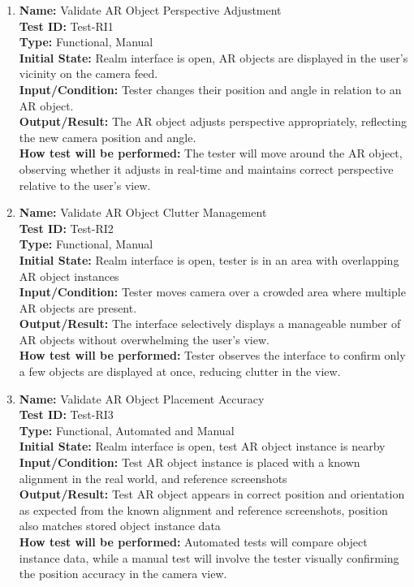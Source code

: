 \documentclass[12pt, titlepage]{article}
\begin{document}
\begin{enumerate}


  \item \textbf{Name:} Validate AR Object Perspective Adjustment \label{itm:Test-RI1} \\
        \textbf{Test ID:} Test-RI1 \\
        \textbf{Type:} Functional, Manual \\
        \textbf{Initial State:} Realm interface is open, AR objects are displayed in the user's vicinity on the camera feed. \\
        \textbf{Input/Condition:} Tester changes their position and angle in relation to an AR object. \\
        \textbf{Output/Result:} The AR object adjusts perspective appropriately, reflecting the new camera position and angle. \\ \textbf{How test will be performed:} The tester will move around the AR object, observing whether it adjusts in real-time and maintains correct perspective relative to the user's view.

  \item \textbf{Name:} Validate AR Object Clutter Management \label{itm:Test-RI2} \\
        \textbf{Test ID:} Test-RI2 \\
        \textbf{Type:} Functional, Manual \\
        \textbf{Initial State:} Realm interface is open, tester is in an area with overlapping AR object instances \\
        \textbf{Input/Condition:} Tester moves camera over a crowded area where multiple AR objects are present. \\
        \textbf{Output/Result:} The interface selectively displays a manageable number of AR objects without overwhelming the user's view. \\ \textbf{How test will be performed:} Tester observes the interface to confirm only a few objects are displayed at once, reducing clutter in the view.

  \item \textbf{Name:} Validate AR Object Placement Accuracy \label{itm:Test-RI3} \\
        \textbf{Test ID:} Test-RI3 \\
        \textbf{Type:} Functional, Automated and Manual \\
        \textbf{Initial State:} Realm interface is open, test AR object instance is nearby \\
        \textbf{Input/Condition:} Test AR object instance is placed with a known alignment in the real world, and reference screenshots \\
        \textbf{Output/Result:} Test AR object appears in correct position and orientation as expected from the known alignment and reference screenshots, position also matches stored object instance data \\
        \textbf{How test will be performed:} Automated tests will compare object instance data, while a manual test will involve the tester visually confirming the position accuracy in the camera view.


\end{enumerate}
\end{document}
